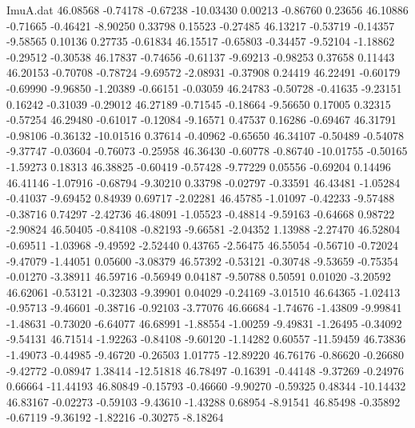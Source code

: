 \begin{filecontents}{ImuA.dat}
  46.08568   -0.74178   -0.67238  -10.03430    0.00213   -0.86760    0.23656
  46.10886   -0.71665   -0.46421   -8.90250    0.33798    0.15523   -0.27485
  46.13217   -0.53719   -0.14357   -9.58565    0.10136    0.27735   -0.61834
  46.15517   -0.65803   -0.34457   -9.52104   -1.18862   -0.29512   -0.30538
  46.17837   -0.74656   -0.61137   -9.69213   -0.98253    0.37658    0.11443
  46.20153   -0.70708   -0.78724   -9.69572   -2.08931   -0.37908    0.24419
  46.22491   -0.60179   -0.69990   -9.96850   -1.20389   -0.66151   -0.03059
  46.24783   -0.50728   -0.41635   -9.23151    0.16242   -0.31039   -0.29012
  46.27189   -0.71545   -0.18664   -9.56650    0.17005    0.32315   -0.57254
  46.29480   -0.61017   -0.12084   -9.16571    0.47537    0.16286   -0.69467
  46.31791   -0.98106   -0.36132  -10.01516    0.37614   -0.40962   -0.65650
  46.34107   -0.50489   -0.54078   -9.37747   -0.03604   -0.76073   -0.25958
  46.36430   -0.60778   -0.86740  -10.01755   -0.50165   -1.59273    0.18313
  46.38825   -0.60419   -0.57428   -9.77229    0.05556   -0.69204    0.14496
  46.41146   -1.07916   -0.68794   -9.30210    0.33798   -0.02797   -0.33591
  46.43481   -1.05284   -0.41037   -9.69452    0.84939    0.69717   -2.02281
  46.45785   -1.01097   -0.42233   -9.57488   -0.38716    0.74297   -2.42736
  46.48091   -1.05523   -0.48814   -9.59163   -0.64668    0.98722   -2.90824
  46.50405   -0.84108   -0.82193   -9.66581   -2.04352    1.13988   -2.27470
  46.52804   -0.69511   -1.03968   -9.49592   -2.52440    0.43765   -2.56475
  46.55054   -0.56710   -0.72024   -9.47079   -1.44051    0.05600   -3.08379
  46.57392   -0.53121   -0.30748   -9.53659   -0.75354   -0.01270   -3.38911
  46.59716   -0.56949    0.04187   -9.50788    0.50591    0.01020   -3.20592
  46.62061   -0.53121   -0.32303   -9.39901    0.04029   -0.24169   -3.01510
  46.64365   -1.02413   -0.95713   -9.46601   -0.38716   -0.92103   -3.77076
  46.66684   -1.74676   -1.43809   -9.99841   -1.48631   -0.73020   -6.64077
  46.68991   -1.88554   -1.00259   -9.49831   -1.26495   -0.34092   -9.54131
  46.71514   -1.92263   -0.84108   -9.60120   -1.14282    0.60557  -11.59459
  46.73836   -1.49073   -0.44985   -9.46720   -0.26503    1.01775  -12.89220
  46.76176   -0.86620   -0.26680   -9.42772   -0.08947    1.38414  -12.51818
  46.78497   -0.16391   -0.44148   -9.37269   -0.24976    0.66664  -11.44193
  46.80849   -0.15793   -0.46660   -9.90270   -0.59325    0.48344  -10.14432
  46.83167   -0.02273   -0.59103   -9.43610   -1.43288    0.68954   -8.91541
  46.85498   -0.35892   -0.67119   -9.36192   -1.82216   -0.30275   -8.18264

\end{filecontents}
